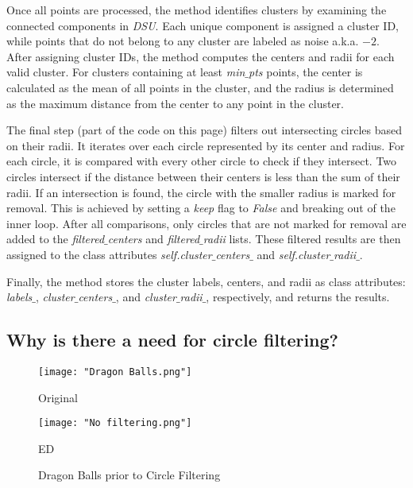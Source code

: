 \documentclass{article}
\begin{document}
	Once all points are processed, the method identifies clusters by examining the connected components in \textit{DSU}. Each unique component is assigned a cluster ID, while points that do not belong to any cluster are labeled as noise a.k.a. $-2$. After assigning cluster IDs, the method computes the centers and radii for each valid cluster. For clusters containing at least \textit{min$\_$pts} points, the center is calculated as the mean of all points in the cluster, and the radius is determined as the maximum distance from the center to any point in the cluster.
	
	The final step (part of the code on this page) filters out intersecting circles based on their radii. It iterates over each circle represented by its center and radius. For each circle, it is compared with every other circle to check if they intersect. Two circles intersect if the distance between their centers is less than the sum of their radii. If an intersection is found, the circle with the smaller radius is marked for removal. This is achieved by setting a \textit{keep} flag to \textit{False} and breaking out of the inner loop. After all comparisons, only circles that are not marked for removal are added to the \textit{filtered$\_$centers} and \textit{filtered$\_$radii} lists. These filtered results are then assigned to the class attributes \textit{self.cluster$\_$centers$\_$} and \textit{self.cluster$\_$radii$\_$}.
	
	Finally, the method stores the cluster labels, centers, and radii as class attributes: \textit{labels$\_$}, \textit{cluster$\_$centers$\_$}, and \textit{cluster$\_$radii$\_$}, respectively, and returns the results.
	
	\subsection*{Why is there a need for circle filtering?}
	
	\begin{figure}[H]
		\centering
		\begin{minipage}{0.25\textwidth}
			\centering
			\texttt{[image: "Dragon Balls.png"]}
			\caption{Original}
		\end{minipage}
		\hspace{0.05\textwidth}
		\begin{minipage}{0.65\textwidth}
			\centering
			\texttt{[image: "No filtering.png"]}
			\caption{ED}
		\end{minipage}
		\caption{Dragon Balls prior to Circle Filtering}
	\end{figure}
	
\end{document}
